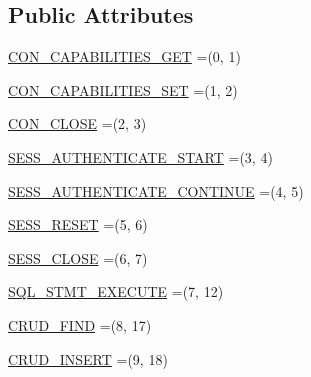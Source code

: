 \subsection*{Public Attributes}
\begin{DoxyCompactItemize}
\item 
\mbox{\hyperlink{enumcom_1_1mysql_1_1cj_1_1x_1_1protobuf_1_1_mysqlx_1_1_client_messages_1_1_type_abd022a075c32420586abeb073f9ac1ba}{C\+O\+N\+\_\+\+C\+A\+P\+A\+B\+I\+L\+I\+T\+I\+E\+S\+\_\+\+G\+ET}} =(0, 1)
\item 
\mbox{\hyperlink{enumcom_1_1mysql_1_1cj_1_1x_1_1protobuf_1_1_mysqlx_1_1_client_messages_1_1_type_af13b881942a51705af18ea1f5f949fb6}{C\+O\+N\+\_\+\+C\+A\+P\+A\+B\+I\+L\+I\+T\+I\+E\+S\+\_\+\+S\+ET}} =(1, 2)
\item 
\mbox{\hyperlink{enumcom_1_1mysql_1_1cj_1_1x_1_1protobuf_1_1_mysqlx_1_1_client_messages_1_1_type_a79461c81af74a9a5997018b1f7997cf3}{C\+O\+N\+\_\+\+C\+L\+O\+SE}} =(2, 3)
\item 
\mbox{\hyperlink{enumcom_1_1mysql_1_1cj_1_1x_1_1protobuf_1_1_mysqlx_1_1_client_messages_1_1_type_a84b3a463ffa3654b49b3e263bf89f081}{S\+E\+S\+S\+\_\+\+A\+U\+T\+H\+E\+N\+T\+I\+C\+A\+T\+E\+\_\+\+S\+T\+A\+RT}} =(3, 4)
\item 
\mbox{\hyperlink{enumcom_1_1mysql_1_1cj_1_1x_1_1protobuf_1_1_mysqlx_1_1_client_messages_1_1_type_aa721f901bec591a58b05b0cde0ad0035}{S\+E\+S\+S\+\_\+\+A\+U\+T\+H\+E\+N\+T\+I\+C\+A\+T\+E\+\_\+\+C\+O\+N\+T\+I\+N\+UE}} =(4, 5)
\item 
\mbox{\hyperlink{enumcom_1_1mysql_1_1cj_1_1x_1_1protobuf_1_1_mysqlx_1_1_client_messages_1_1_type_a5838e90ca9ca0ce3d07cf28ec866bd06}{S\+E\+S\+S\+\_\+\+R\+E\+S\+ET}} =(5, 6)
\item 
\mbox{\hyperlink{enumcom_1_1mysql_1_1cj_1_1x_1_1protobuf_1_1_mysqlx_1_1_client_messages_1_1_type_ac8ed4cdea285b6ab6b172324ca5e18fd}{S\+E\+S\+S\+\_\+\+C\+L\+O\+SE}} =(6, 7)
\item 
\mbox{\hyperlink{enumcom_1_1mysql_1_1cj_1_1x_1_1protobuf_1_1_mysqlx_1_1_client_messages_1_1_type_a5e8f86b62db3ea42fbacecf88a61d6c0}{S\+Q\+L\+\_\+\+S\+T\+M\+T\+\_\+\+E\+X\+E\+C\+U\+TE}} =(7, 12)
\item 
\mbox{\hyperlink{enumcom_1_1mysql_1_1cj_1_1x_1_1protobuf_1_1_mysqlx_1_1_client_messages_1_1_type_a47ba1345e9342b57e2456c0797ed25f2}{C\+R\+U\+D\+\_\+\+F\+I\+ND}} =(8, 17)
\item 
\mbox{\hyperlink{enumcom_1_1mysql_1_1cj_1_1x_1_1protobuf_1_1_mysqlx_1_1_client_messages_1_1_type_adad52a1799e15022e860cbcf2db58491}{C\+R\+U\+D\+\_\+\+I\+N\+S\+E\+RT}} =(9, 18)

\end{DoxyCompactItemize}

